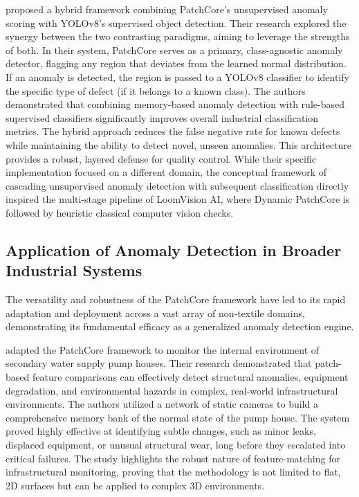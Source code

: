 \documentclass{ieeeaccess}
\begin{document}
\cite{b19} proposed a hybrid framework combining PatchCore's unsupervised anomaly scoring with YOLOv8's supervised object detection. Their research explored the synergy between the two contrasting paradigms, aiming to leverage the strengths of both. In their system, PatchCore serves as a primary, class-agnostic anomaly detector, flagging any region that deviates from the learned normal distribution. If an anomaly is detected, the region is passed to a YOLOv8 classifier to identify the specific type of defect (if it belongs to a known class). The authors demonstrated that combining memory-based anomaly detection with rule-based supervised classifiers significantly improves overall industrial classification metrics. The hybrid approach reduces the false negative rate for known defects while maintaining the ability to detect novel, unseen anomalies. This architecture provides a robust, layered defense for quality control. While their specific implementation focused on a different domain, the conceptual framework of cascading unsupervised anomaly detection with subsequent classification directly inspired the multi-stage pipeline of LoomVision AI, where Dynamic PatchCore is followed by heuristic classical computer vision checks.

\subsection{Application of Anomaly Detection in Broader Industrial Systems}

The versatility and robustness of the PatchCore framework have led to its rapid adaptation and deployment across a vast array of non-textile domains, demonstrating its fundamental efficacy as a generalized anomaly detection engine.

\cite{b20} adapted the PatchCore framework to monitor the internal environment of secondary water supply pump houses. Their research demonstrated that patch-based feature comparisons can effectively detect structural anomalies, equipment degradation, and environmental hazards in complex, real-world infrastructural environments. The authors utilized a network of static cameras to build a comprehensive memory bank of the normal state of the pump house. The system proved highly effective at identifying subtle changes, such as minor leaks, displaced equipment, or unusual structural wear, long before they escalated into critical failures. The study highlights the robust nature of feature-matching for infrastructural monitoring, proving that the methodology is not limited to flat, 2D surfaces but can be applied to complex 3D environments.
\end{document}
